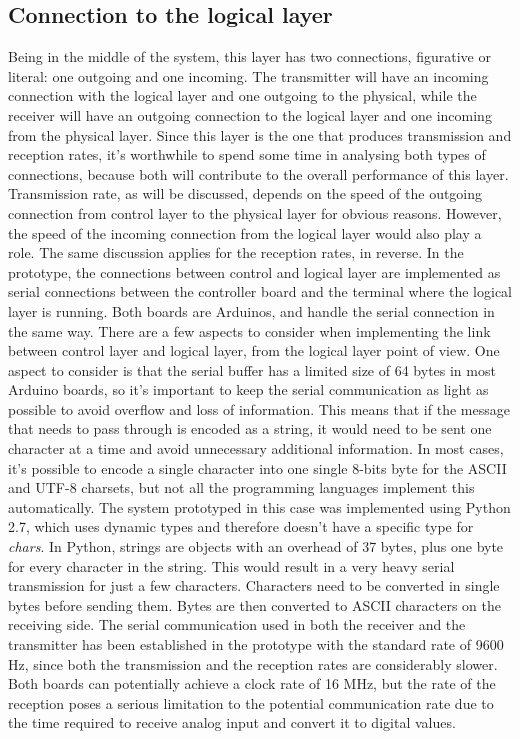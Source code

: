 \subsection{Connection to the logical layer}
Being in the middle of the system, this layer has two connections, figurative or literal: one outgoing and one incoming.
The transmitter will have an incoming connection with the logical layer and one outgoing to the physical, while the receiver will have an outgoing connection to the logical layer and one incoming from the physical layer.
Since this layer is the one that produces transmission and reception rates, it's worthwhile to spend some time in analysing both types of connections, because both will contribute to the overall performance of this layer.
Transmission rate, as will be discussed, depends on the speed of the outgoing connection from control layer to the physical layer for obvious reasons.
However, the speed of the incoming connection from the logical layer would also play a role.
The same discussion applies for the reception rates, in reverse.
In the prototype, the connections between control and logical layer are implemented as serial connections between the controller board and the terminal where the logical layer is running.
Both boards are Arduinos, and handle the serial connection in the same way.
There are a few aspects to consider when implementing the link between control layer and logical layer, from the logical layer point of view.
One aspect to consider is that the serial buffer has a limited size of 64 bytes in most Arduino boards, so it's important to keep the serial communication as light as possible to avoid overflow and loss of information.
This means that if the message that needs to pass through is encoded as a string, it would need to be sent one character at a time and avoid unnecessary additional information.
In most cases, it's possible to encode a single character into one single 8-bits byte for the ASCII and UTF-8 charsets, but not all the programming languages implement this automatically.
The system prototyped in this case was implemented using Python 2.7, which uses dynamic types and therefore doesn't have a specific type for \textit{chars}. 
In Python, strings are objects with an overhead of 37 bytes, plus one byte for every character in the string.
This would result in a very heavy serial transmission for just a few characters. Characters need to be converted in single bytes before sending them. 
Bytes are then converted to ASCII characters on the receiving side.
The serial communication used in both the receiver and the transmitter has been established in the prototype with the standard rate of 9600 Hz, since both the transmission and the reception rates are considerably slower.
Both boards can potentially achieve a clock rate of 16 MHz, but the rate of the reception poses a serious limitation to the potential communication rate due to the time required to receive analog input and convert it to digital values.

